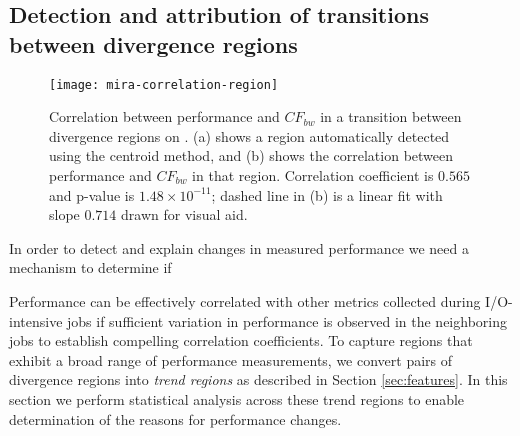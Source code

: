 \subsection{Detection and attribution of transitions between divergence regions} \label{sec:results/transitions}

\begin{figure}
    \centering
    \texttt{[image: mira-correlation-region]}
    \vspace{-.35in}
    \caption{Correlation between performance and $CF_{bw}$ in a transition between divergence regions on \mira. (a) shows a region automatically detected using the centroid method, and (b) shows the correlation between performance and $CF_{bw}$ in that region.  Correlation coefficient is $0.565$ and p-value is ${1.48 \times 10^{-11}}$; dashed line in (b) is a linear fit with slope $0.714$ drawn for visual aid.}
    \label{fig:mira-correlation-region}
\end{figure}


In order to detect and explain changes in measured performance we need a mechanism to determine if

Performance can be effectively correlated with other metrics collected during I/O-intensive jobs if sufficient variation in performance is observed in the neighboring jobs to establish compelling correlation coefficients.
To capture regions that exhibit a broad range of performance measurements, we convert pairs of divergence regions into \emph{trend regions} as described in Section \ref{sec:features}. In this section we perform statistical analysis across these trend regions to enable determination of the reasons for performance changes. 

%
%

